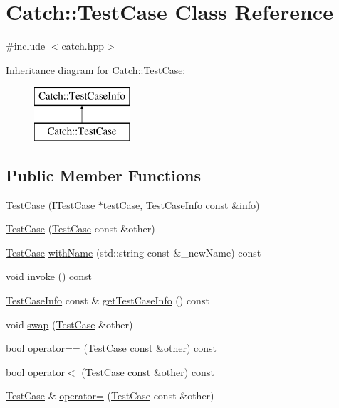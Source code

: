 \hypertarget{classCatch_1_1TestCase}{\section{Catch\-:\-:Test\-Case Class Reference}
\label{classCatch_1_1TestCase}
}


{\ttfamily \#include $<$catch.\-hpp$>$}

Inheritance diagram for Catch\-:\-:Test\-Case\-:\begin{figure}[H]
\begin{center}
\leavevmode
\includegraphics[height=2.000000cm]{classCatch_1_1TestCase}
\end{center}
\end{figure}
\subsection*{Public Member Functions}
\begin{DoxyCompactItemize}
\item 
\hyperlink{classCatch_1_1TestCase_a03a5b913484681bd6d398dc5e9c2a907}{Test\-Case} (\hyperlink{structCatch_1_1ITestCase}{I\-Test\-Case} $\ast$test\-Case, \hyperlink{structCatch_1_1TestCaseInfo}{Test\-Case\-Info} const \&info)
\item 
\hyperlink{classCatch_1_1TestCase_ac0011d3789edc3e44edb41f13c4775a0}{Test\-Case} (\hyperlink{classCatch_1_1TestCase}{Test\-Case} const \&other)
\item 
\hyperlink{classCatch_1_1TestCase}{Test\-Case} \hyperlink{classCatch_1_1TestCase_ab6dbc6c82b7c1680013c67bdedccfc8e}{with\-Name} (std\-::string const \&\-\_\-new\-Name) const 
\item 
void \hyperlink{classCatch_1_1TestCase_aac2e028135cc88c3e3aac04650960a6c}{invoke} () const 
\item 
\hyperlink{structCatch_1_1TestCaseInfo}{Test\-Case\-Info} const \& \hyperlink{classCatch_1_1TestCase_a25c03661ab092431cdff10df5c58a5a7}{get\-Test\-Case\-Info} () const 
\item 
void \hyperlink{classCatch_1_1TestCase_aee38f908faf10b905b209ca388275413}{swap} (\hyperlink{classCatch_1_1TestCase}{Test\-Case} \&other)
\item 
bool \hyperlink{classCatch_1_1TestCase_a40eab521b316c7d476f6b4dd1c33eec8}{operator==} (\hyperlink{classCatch_1_1TestCase}{Test\-Case} const \&other) const 
\item 
bool \hyperlink{classCatch_1_1TestCase_aa5174e85e3aac6e7398dee9c76730324}{operator$<$} (\hyperlink{classCatch_1_1TestCase}{Test\-Case} const \&other) const 
\item 
\hyperlink{classCatch_1_1TestCase}{Test\-Case} \& \hyperlink{classCatch_1_1TestCase_a8022e3f74232f7887d2d2cbbc8876502}{operator=} (\hyperlink{classCatch_1_1TestCase}{Test\-Case} const \&other)
\end{DoxyCompactItemize}
